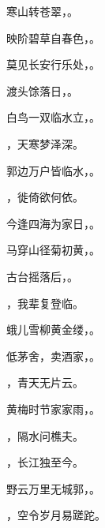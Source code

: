 \documentclass[12pt, a4paper, addpoints]{exam}
\begin{document}
\begin{questions}
\question[1] 寒山转苍翠，\uline{\qquad\qquad\qquad}。

\question[1] 映阶碧草自春色，\uline{\qquad\qquad\qquad}。

\question[1] 莫见长安行乐处，\uline{\qquad\qquad\qquad}。

\question[1] 渡头馀落日，\uline{\qquad\qquad\qquad}。

\question[1] 白鸟一双临水立，\uline{\qquad\qquad\qquad}。

\question[1] \uline{\qquad\qquad\qquad}，天寒梦泽深。

\question[1] 郭边万户皆临水，\uline{\qquad\qquad\qquad}。

\question[1] \uline{\qquad\qquad\qquad}，徙倚欲何依。

\question[1] 今逢四海为家日，\uline{\qquad\qquad\qquad}。

\question[1] 马穿山径菊初黄，\uline{\qquad\qquad\qquad}。

\question[1] 古台摇落后，\uline{\qquad\qquad\qquad}。

\question[1] \uline{\qquad\qquad\qquad}，我辈复登临。

\question[1] 蛾儿雪柳黄金缕，\uline{\qquad\qquad\qquad}。

\question[1] 低茅舍，卖酒家，\uline{\qquad\qquad\qquad}。

\question[1] \uline{\qquad\qquad\qquad}，青天无片云。

\question[1] 黄梅时节家家雨，\uline{\qquad\qquad\qquad}。

\question[1] \uline{\qquad\qquad\qquad}，隔水问樵夫。

\question[1] \uline{\qquad\qquad\qquad}，长江独至今。

\question[1] 野云万里无城郭，\uline{\qquad\qquad\qquad}。

\question[1] \uline{\qquad\qquad\qquad}，空令岁月易蹉跎。

\end{questions}

\hspace{5cm}
\end{document}

